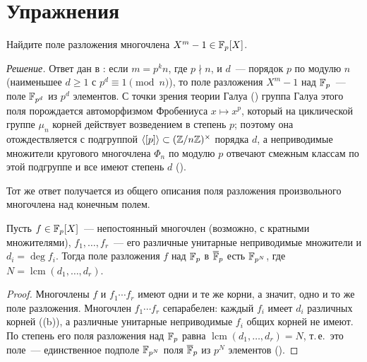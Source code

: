 \makeatletter
{}
\makeatother
\section*{Упражнения}

\begin{exercise}[4-1]
Найдите поле разложения многочлена $X^m-1\in\mathbb F_p[X]$.
\end{exercise}

\noindent\emph{Решение.} Ответ дан в : если $m=p^kn$, где $p\nmid n$, и $d$~--- порядок $p$ по модулю $n$ (наименьшее
$d\ge1$ с $p^d\equiv1\pmod n$), то поле разложения $X^m-1$ над $\mathbb F_p$~--- поле $\mathbb F_{p^d}$ из $p^d$ элементов. С точки
зрения теории Галуа () группа Галуа этого поля порождается автоморфизмом Фробениуса $x\mapsto x^p$, который на
циклической группе $\mu_n$ корней действует возведением в степень $p$; поэтому она отождествляется с подгруппой
$\langle[p]\rangle\subset(\mathbb Z/n\mathbb Z)^\times$ порядка $d$, а неприводимые множители кругового многочлена $\Phi_n$ по модулю $p$
отвечают смежным классам по этой подгруппе и все имеют степень $d$ ().

Тот же ответ получается из общего описания поля разложения произвольного многочлена над конечным полем.

\begin{proposition}[4.39k]
Пусть $f\in\mathbb F_p[X]$~--- непостоянный многочлен \textup(возможно, с кратными множителями\textup), $f_1,\dots,f_r$~--- его
различные унитарные неприводимые множители и $d_i=\deg f_i$. Тогда поле разложения $f$ над $\mathbb F_p$ в $\overline{\mathbb F}_p$ есть $\mathbb F_{p^N}$,
где $N=\operatorname{lcm}(d_1,\dots,d_r)$.
\end{proposition}

\begin{proof}
Многочлены $f$ и $f_1\cdots f_r$ имеют одни и те же корни, а значит, одно и то же поле разложения. Многочлен $f_1\cdots f_r$
сепарабелен: каждый $f_i$ имеет $d_i$ различных корней ((b)), а различные унитарные неприводимые $f_i$ общих корней не
имеют. По  степень его поля разложения над $\mathbb F_p$ равна $\operatorname{lcm}(d_1,\dots,d_r)=N$, т.\,е.\ это поле~---
единственное подполе $\mathbb F_{p^N}$ поля $\overline{\mathbb F}_p$ из $p^N$ элементов ().
\end{proof}

